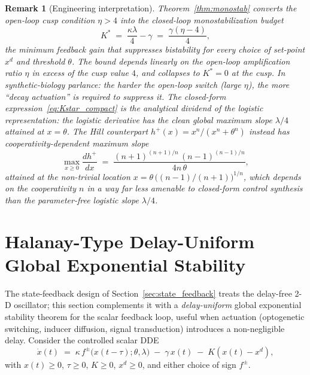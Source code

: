 \documentclass[12pt]{article}
\newtheorem{remark}{Remark}
\newcommand{\fpm}{f^{\pm}}
\begin{document}
\begin{remark}[Engineering interpretation]
\label{rem:monostab}
Theorem~\ref{thm:monostab} converts the open-loop cusp condition
$\eta>4$ into the closed-loop \emph{monostabilization budget}
\begin{equation}
K^{*} \;=\; \frac{\kappa\lambda}{4}-\gamma
       \;=\; \frac{\gamma(\eta-4)}{4},
\label{eq:Kstar_compact}
\end{equation}
the minimum feedback gain that suppresses bistability for every
choice of set-point $x^{d}$ and threshold $\theta$. The bound depends
linearly on the open-loop amplification ratio $\eta$ in excess of the
cusp value $4$, and collapses to $K^{*}=0$ at the cusp. In
synthetic-biology parlance: the harder the open-loop switch (large
$\eta$), the more ``decay actuation'' is required to suppress it.
The closed-form expression~\eqref{eq:Kstar_compact} is the analytical
dividend of the logistic representation: the logistic derivative has the
clean global maximum slope $\lambda/4$ attained at $x=\theta$. The Hill
counterpart $h^+(x)=x^n/(x^n+\theta^n)$ instead has cooperativity-dependent
maximum slope
\[
\max_{x\ge 0} \frac{d h^+}{dx}
   \;=\; \frac{(n+1)^{(n+1)/n}\,(n-1)^{(n-1)/n}}{4n\,\theta},
\]
attained at the non-trivial location
$x=\theta\,\bigl((n-1)/(n+1)\bigr)^{1/n}$, which depends on the
cooperativity $n$ in a way far less amenable to closed-form control
synthesis than the parameter-free logistic slope $\lambda/4$.
\end{remark}

\section{Halanay-Type Delay-Uniform Global Exponential Stability}
\label{sec:halanay}

The state-feedback design of Section~\ref{sec:state_feedback} treats
the delay-free 2-D oscillator; this section complements it
with a \emph{delay-uniform} global exponential stability theorem for
the scalar feedback loop, useful when actuation (optogenetic
switching, inducer diffusion, signal transduction) introduces a
non-negligible delay. Consider the controlled scalar DDE
\begin{equation}
\dot x(t) \;=\; \kappa\,\fpm\!\bigl(x(t-\tau);\theta,\lambda\bigr)
              \;-\;\gamma\,x(t)\;-\;K(x(t)-x^{d}),
\label{eq:scalar_dde_pfb}
\end{equation}
with $x(t)\ge 0$, $\tau\ge 0$, $K\ge 0$, $x^{d}\ge 0$, and either choice of sign $\fpm$.
\end{document}
